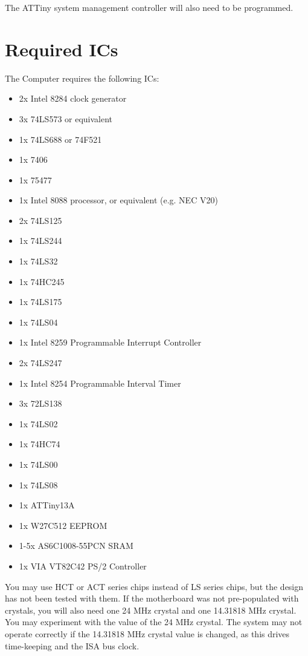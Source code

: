 \documentclass[twoside,10pt,letterpaper]{refart}
\begin{document}
The ATTiny system management controller will also need to be programmed.

\section{Required ICs}
The  Computer requires the following ICs:
\begin{itemize}
    \item 2x Intel 8284 clock generator
    \item 3x 74LS573 or equivalent
    \item 1x 74LS688 or 74F521
    \item 1x 7406
    \item 1x 75477
    \item 1x Intel 8088 processor, or equivalent (e.g. NEC V20)
    \item 2x 74LS125
    \item 1x 74LS244
    \item 1x 74LS32
    \item 1x 74HC245
    \item 1x 74LS175
    \item 1x 74LS04
    \item 1x Intel 8259 Programmable Interrupt Controller
    \item 2x 74LS247
    \item 1x Intel 8254 Programmable Interval Timer
    \item 3x 72LS138
    \item 1x 74LS02
    \item 1x 74HC74
    \item 1x 74LS00
    \item 1x 74LS08
    \item 1x ATTiny13A
    \item 1x W27C512 EEPROM
    \item 1-5x AS6C1008-55PCN SRAM
    \item 1x VIA VT82C42 PS/2 Controller
\end{itemize}

You may use HCT or ACT series chips instead of LS series chips, but the design has not
been tested with them. If the motherboard was not pre-populated with crystals, you will
also need one 24 MHz crystal and one 14.31818 MHz crystal. You may experiment with the
value of the 24 MHz crystal. The system may not operate correctly if the 14.31818 MHz
crystal value is changed, as this drives time-keeping and the ISA bus clock.
\end{document}
